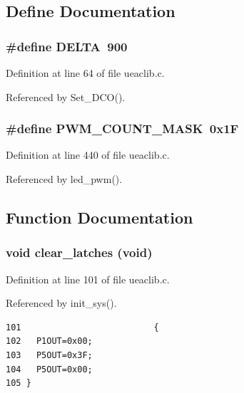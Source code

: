 \subsection{Define Documentation}
\subsubsection{\setlength{\rightskip}{0pt plus 5cm}\#define DELTA~900}\label{ueaclib_8c_a0}




Definition at line 64 of file ueaclib.c.

Referenced by Set\_\-DCO().
\subsubsection{\setlength{\rightskip}{0pt plus 5cm}\#define PWM\_\-COUNT\_\-MASK~0x1F}\label{ueaclib_8c_a1}




Definition at line 440 of file ueaclib.c.

Referenced by led\_\-pwm().

\subsection{Function Documentation}
\subsubsection{\setlength{\rightskip}{0pt plus 5cm}void clear\_\-latches (void)}\label{ueaclib_8c_a11}




Definition at line 101 of file ueaclib.c.

Referenced by init\_\-sys().

\footnotesize\begin{verbatim}101                          {
102   P1OUT=0x00;
103   P5OUT=0x3F;
104   P5OUT=0x00;
105 }
\end{verbatim}\normalsize 



